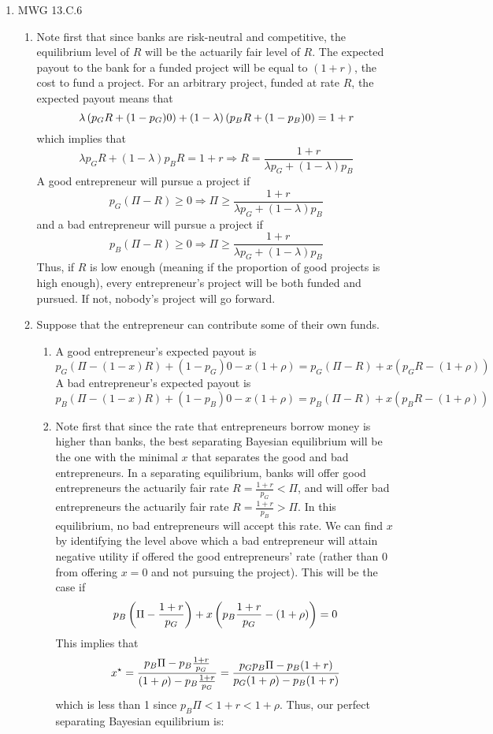 \documentclass[12pt]{article}
\begin{document}
\begin{enumerate}
\begin{enumerate}
	\end{enumerate}
	\item MWG 13.C.6
	\begin{enumerate}
		\item Note first that since banks are risk-neutral and competitive, the equilibrium level of $R$ will be the actuarily fair level of $R$. The expected payout to the bank for a funded project will be equal to $(1+r)$, the cost to fund a project. For an arbitrary project, funded at rate $R$, the expected payout means that
		\[
		\lambda \left( p_G R + (1-p_G)0\right) + (1-\lambda)\left( p_B R + (1-p_B)0\right) = 1+r
		\]
		which implies that
		\[
		\lambda p_G R + (1-\lambda)p_BR = 1 + r \Longrightarrow R = \frac{1+r}{\lambda p_G + (1-\lambda)p_B}
		\]
		A good entrepreneur will pursue a project if
		\[
		p_G(\Pi - R) \ge 0 \Longrightarrow \Pi \ge \frac{1+r}{\lambda p_G + (1-\lambda)p_B}
		\]
		and a bad entrepreneur will pursue a project if
		\[
		p_B(\Pi - R) \ge 0 \Longrightarrow \Pi \ge \frac{1+r}{\lambda p_G + (1-\lambda)p_B}
		\]
		Thus, if $R$ is low enough (meaning if the proportion of good projects is high enough), every entrepreneur's project will be both funded and pursued. If not, nobody's project will go forward.
		\item Suppose that the entrepreneur can contribute some of their own funds.
		\begin{enumerate}
			\item A good entrepreneur's expected payout is
			\[
			p_G (\Pi - (1-x)R) + (1-p_G)0 - x(1+\rho) = p_G(\Pi - R)+ x(p_GR - (1+\rho))
			\]
			A bad entrepreneur's expected payout is
			\[
			p_B (\Pi - (1-x)R) + (1-p_B)0 - x(1+\rho) = p_B(\Pi - R)+ x(p_BR - (1+\rho))
			\]
			\item Note first that since the rate that entrepreneurs borrow money is higher than banks, the best separating Bayesian equilibrium will be the one with the minimal $x$ that separates the good and bad entrepreneurs. In a separating equilibrium, banks will offer good entrepreneurs the actuarily fair rate $R = \frac{1+r}{p_G} < \Pi$, and will offer bad entrepreneurs the actuarily fair rate $R = \frac{1+r}{p_B} > \Pi$. In this equilibrium, no bad entrepreneurs will accept this rate. We can find $x$ by identifying the level above which a bad entrepreneur will attain negative utility if offered the good entrepreneurs' rate (rather than 0 from offering $x = 0$ and not pursuing the project). This will be the case if
			\[
			p_B\left( \Pi - \frac{1+r}{p_G}\right) + x\left( p_B \frac{1+r}{p_G} - (1+\rho)\right) = 0
			\]
			This implies that
			\[
			x^\star = \frac{p_B \Pi - p_B \frac{1+r}{p_G}}{(1+\rho) -  p_B \frac{1+r}{p_G}} = \frac{p_Gp_B\Pi - p_B(1+r)}{p_G(1+\rho) - p_B(1+r)}
			\]
			which is less than 1 since $p_B\Pi < 1+r < 1 + \rho$. Thus, our perfect separating Bayesian equilibrium is:
			

\end{enumerate}
\end{enumerate}
\end{enumerate}
\end{document}
